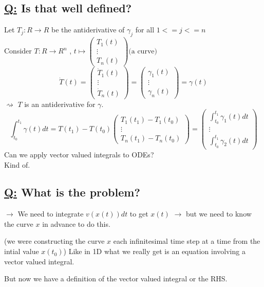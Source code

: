 \documentclass[a4paper, 12pt]{article}
\begin{document}
\subsection{\underline{Q:} Is that well defined?}
Let $T_j : R \rightarrow R$ be the antiderivative of $\gamma_j$ for all $ 1 <= j <= n$\\
Consider $T : R \rightarrow R^n$ , $t \mapsto  \begin{pmatrix} T_1 (t)\\ \vdots \\ T_n (t) \end{pmatrix} \text{(a curve)}$
$$ \dot{T} (t) = \begin{pmatrix} \dot{T}_1 (t)\\ \vdots \\ \dot{T}_n (t) \end{pmatrix} =  \begin{pmatrix} \gamma_1 (t)\\ \vdots \\ \gamma_n (t) \end{pmatrix} = \gamma(t)$$
$\rightsquigarrow$ $T$ is an antiderivative for $\gamma$.
$$\int_{t_0}^{t_1} \gamma (t) dt = T(t_1) - T(t_0) \begin{pmatrix} T_1(t_1) - T_1(t_0) \\ \vdots \\ T_n(t_1) - T_n(t_0) \end{pmatrix} = \begin{pmatrix} \int_{t_0}^{t_1} \gamma_1 (t) dt \\ \vdots \\ \int_{t_0}^{t_1} \gamma_2 (t) dt \end{pmatrix}$$
Can we apply vector valued integrals to ODEs?\\
Kind of.
\subsection{\underline{Q:} What is the problem?}
$\rightarrow$ We need to integrate $v(x(t))dt$ to get $x(t)$
$\rightarrow$ but we need to know the curve $x$ in advance to do this.
(we were constructing the curve $x$ each infinitesimal time step at a time from the intial value $x(t_0)$)
Like in 1D what we really get is an equation involving a vector valued integral.
But now we have a definition of the vector valued integral or the RHS.
\end{document}
